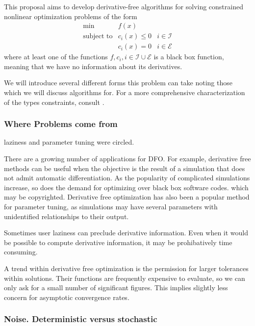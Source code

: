 \documentclass{article}
\begin{document}
This proposal aims to develop derivative-free algorithms for solving constrained nonlinear optimization problems of the form
\[ \begin{array}{ccl} \min & f(x) \\
\mbox{subject to} & c_i(x) \le 0 & i \in \mathcal{I} \\
& c_i(x) = 0 & i \in \mathcal{E}
\end{array}
\]
where at least one of the functions $f, c_i, i \in \mathcal{I} \cup \mathcal{E}$ is a black box function, meaning that we have no information about its derivatives.

We will introduce several different forms this problem can take noting those which we will discuss algorithms for.
For a more comprehensive characterization of the types constraints, consult \cite{DUMMY:typesofconstraints}.


\subsubsection{Where Problems come from}

\color{red}
laziness and parameter tuning were circled.


There are a growing number of applications for DFO. 
For example, derivative free methods can be useful when the objective is the result of a simulation that does not admit automatic differentiation.
As the popularity of complicated simulations increase, so does the demand for optimizing over black box software codes.
 which may be copyrighted.
Derivative free optimization has also been a popular method for parameter tuning, as simulations may have several parameters with unidentified relationships to their output.

\color{black}




Sometimes user laziness can preclude derivative information.
Even when it would be possible to compute derivative information, it may be prohibatively time consuming.

A trend within derivative free optimization is the permission for larger tolerances within solutions.
Their functions are frequently expensive to evaluate, so we can only ask for a small number of significant figures.
This implies slightly less concern for asymptotic convergence rates.


\subsubsection{Noise. Deterministic versus stochastic}
\end{document}
